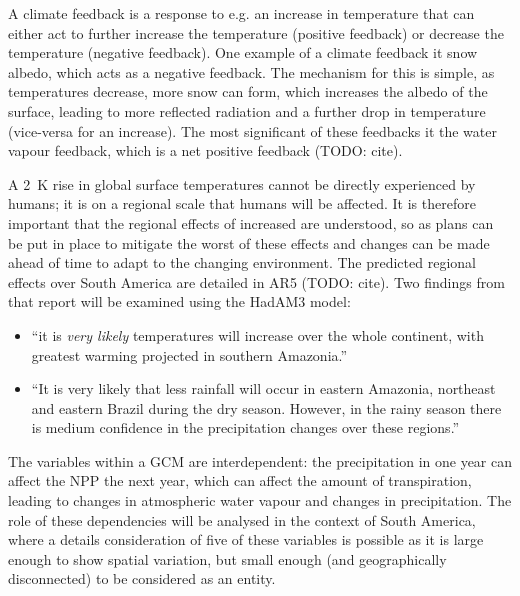 \documentclass{article}
\newif\ifsubsection
\begin{document}
A climate feedback is a response to e.g. an increase in temperature that can either act to further increase the temperature (positive feedback) or decrease the temperature (negative feedback). One example of a climate feedback it snow albedo, which acts as a negative feedback. The mechanism for this is simple, as temperatures decrease, more snow can form, which increases the albedo of the surface, leading to more reflected radiation and a further drop in temperature (vice-versa for an increase). The most significant of these feedbacks it the water vapour feedback, which is a net positive feedback (TODO: cite).

\ifsubsection
\subsection{Regional effects of increased \ce{CO2}}
\fi
A \SI{2}{K} rise in global surface temperatures cannot be directly experienced by humans; it is on a regional scale that humans will be affected. It is therefore important that the regional effects of increased  are understood, so as plans can be put in place to mitigate the worst of these effects and changes can be made ahead of time to adapt to the changing environment. The predicted regional effects over South America are detailed in AR5 (TODO: cite). Two findings from that report will be examined using the HadAM3 model:
\begin{itemize}
    \item ``it is \textit{very likely} temperatures will increase over the whole continent, with greatest warming projected in southern Amazonia.''
    \item ``It is very likely that less rainfall will occur in eastern Amazonia, northeast and eastern Brazil during the dry season. However, in the rainy season there is medium confidence in the precipitation changes over these regions.''
\end{itemize}

The variables within a GCM are interdependent: the precipitation in one year can affect the NPP the next year, which can affect the amount of transpiration, leading to changes in atmospheric water vapour and changes in precipitation. The role of these dependencies will be analysed in the context of South America, where a details consideration of five of these variables is possible as it is large enough to show spatial variation, but small enough (and geographically disconnected) to be considered as an entity.
\end{document}

